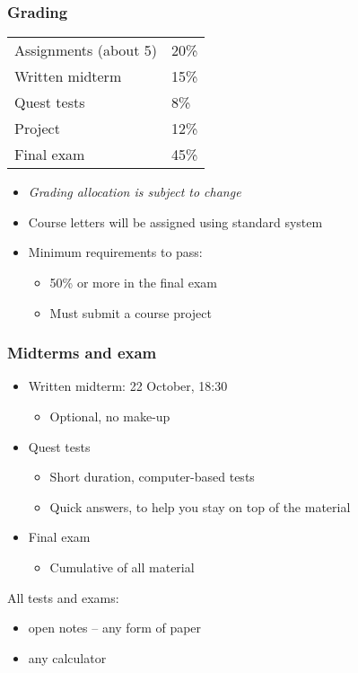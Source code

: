 \begin{frame}\frametitle{Grading}
	\begin{tabular}{ll}\\
		Assignments (about 5)       	& 20\% \\
	    Written midterm        			& 15\% \\
	    Quest tests						& 8\% \\
	    Project      					& 12\% \\
	    Final exam 						& 45\% \\
	\end{tabular}
	
	\vspace{12pt}
	\vspace{12pt}
	
	\begin{itemize}
		\item	\emph{Grading allocation is subject to change}
		\item	Course letters will be assigned using standard system
		\item	Minimum requirements to pass:
		\begin{itemize}
			\item	50\% or more in the final exam
			\item	Must submit a course project
		\end{itemize}
	\end{itemize}
\end{frame}

\begin{frame}\frametitle{Midterms and exam}
	\begin{itemize}
		\item	Written midterm: 22 October, 18:30
		\begin{itemize}
			\item	Optional, no make-up
		\end{itemize}
		
		\item	Quest tests
		\begin{itemize}
			\item	Short duration, computer-based tests
			\item	Quick answers, to help you stay on top of the material
		\end{itemize}
		
		\item	Final exam
		\begin{itemize}
			\item	Cumulative of all material
		\end{itemize}		
	\end{itemize}

	\vspace{12pt}
	All tests and exams:
	\begin{itemize}
		\item	open notes -- any form of paper
		\item	any calculator
	\end{itemize}	
\end{frame}

